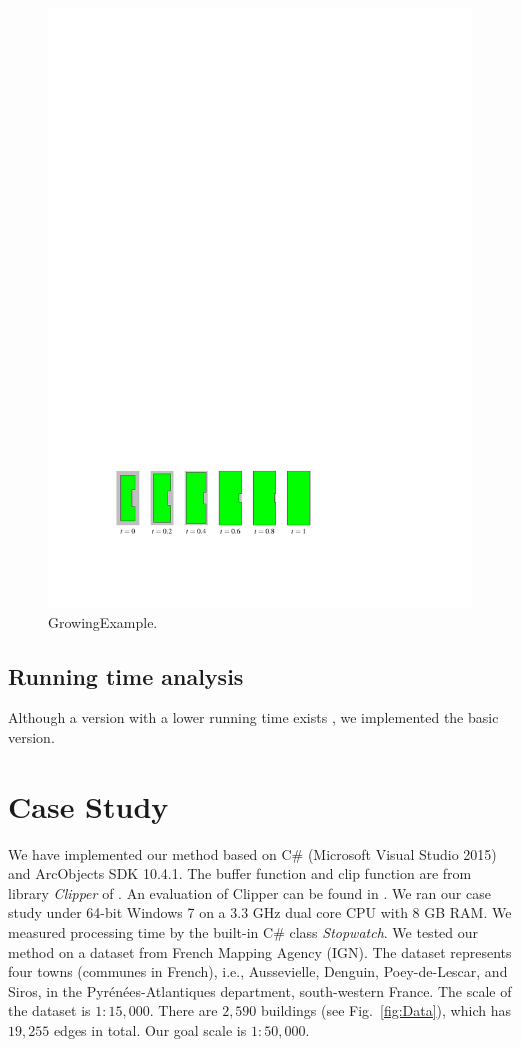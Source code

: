 \documentclass[graybox]{svmult}
\newcommand{\fig}{Fig.~}
\begin{document}
\begin{figure}[tb]
	\centering
	\includegraphics{GrowingExample}
	\caption{GrowingExample.}
	\label{fig:GrowingExample}
\end{figure}

\subsection{Running time analysis}
Although a version with a 
lower running time exists \parencite[see][]{Chan1992}, we implemented the basic 
version.


\section{Case Study}
\label{sec:CaseStudy}
We have implemented our method based on
C\# (Microsoft Visual Studio 2015) and ArcObjects SDK 10.4.1.
The buffer function and clip function are from library \emph{Clipper} 
of \textcite{Johnson2014}.
An evaluation of Clipper can be found in \textcite{Palfrader2015}.
We ran our case study under 64-bit 
Windows 7 on a 3.3 GHz dual core CPU with 8 GB RAM.
We measured processing time by the built-in C\# class 
\emph{Stopwatch}.
We tested our method on a dataset from French Mapping Agency (IGN).
The dataset represents four towns (communes in French), i.e., Aussevielle, 
Denguin,  Poey-de-Lescar, and Siros, in the 
Pyr\'en\'ees-Atlantiques department, south-western France.
The scale of the dataset is $1:15{,}000$.
There are $2{,}590$ buildings (see \fig\ref{fig:Data}), 
which has $19{,}255$ edges in total.
Our goal scale is $1:50{,}000$.
\end{document}
